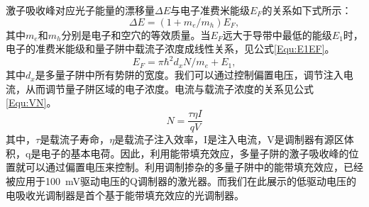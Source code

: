 激子吸收峰对应光子能量的漂移量$\Delta E$与电子准费米能级$E_F$的关系如下式所示\cite{livescu1988free}：
\begin{equation}
\label{Equ:DEEF}
\Delta E = (1+m_e/m_h)E_F,
\end{equation}
其中$m_e$和$m_h$分别是电子和空穴的等效质量。当$E_F$远大于导带中最低的能级$E_1$时，电子的准费米能级和量子阱中载流子浓度成线性关系，见公式\ref{Equ:E1EF}\cite{coldren1995diode}。
\begin{equation}
\label{Equ:E1EF}
E_F = \pi\hbar^2d_xN/m_e+E_1,
\end{equation}
其中$d_x$是多量子阱中所有势阱的宽度。我们可以通过控制偏置电压，调节注入电流，从而调节量子阱区域的电子浓度。电流与载流子浓度的关系见公式\ref{Equ:VN}。
\begin{equation}
\label{Equ:VN}
N = \frac{\tau\eta I}{qV}
\end{equation}
其中，$\tau$是载流子寿命，$\eta$是载流子注入效率，I是注入电流，V是调制器有源区体积，q是电子的基本电荷。因此，利用能带填充效应，多量子阱的激子吸收峰的位置就可以通过偏置电压来控制。利用调制掺杂的多量子阱中的能带填充效应，已经被应用于100~mV驱动电压的Q调制器的激光器\cite{kalinovsky1993free}。而我们在此展示的低驱动电压的电吸收光调制器是首个基于能带填充效应的光调制器。

